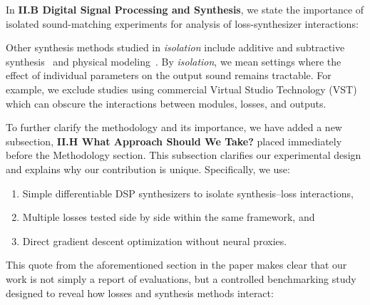 \documentclass[11pt]{article}
\begin{document}
\medskip
\noindent In \textbf{II.B Digital Signal Processing and Synthesis}, we state the importance of isolated sound-matching experiments for analysis of loss-synthesizer interactions:
\begin{displayquote}
    
Other synthesis methods studied in \textit{isolation} include additive and subtractive synthesis~\cite{engel2020ddsp,masuda2023improving,salimi2020make} and physical modeling~\cite{riionheimo2003parameter,han2024learning}. By \textit{isolation}, we mean settings where the effect of individual parameters on the output sound remains tractable. For example, we exclude studies using commercial Virtual Studio Technology (VST) which can obscure the interactions between modules, losses, and outputs. 
\end{displayquote}

\noindent To further clarify the methodology and its importance, we have added a new subsection, \textbf{II.H What Approach Should We Take?} placed immediately before the Methodology section. This subsection clarifies our experimental design and explains why our contribution is unique. Specifically, we use:  
\begin{enumerate}
  \item Simple differentiable DSP synthesizers to isolate synthesis--loss interactions,  
  \item Multiple losses tested side by side within the same framework, and  
  \item Direct gradient descent optimization without neural proxies.  
\end{enumerate}

This quote from the aforementioned section in the paper makes clear that our work is not simply a report of evaluations, but a controlled benchmarking study designed to reveal how losses and synthesis methods interact: 
\end{document}

